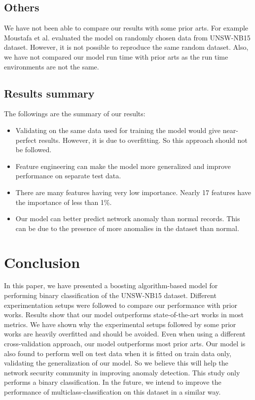 \documentclass[14pt, conference]{IEEEtran}
\begin{document}
\subsection{Others}
We have not been able to compare our results with some prior arts. For example Moustafa et al. \cite{moustafa2017hybrid} \cite{moustafa2018anomaly} \cite{moustafa2019holistic} evaluated the model on randomly chosen data from UNSW-NB15 dataset. However, it is not possible to reproduce the same random dataset. Also, we have not compared our model run time with prior arts as the run time environments are not the same.



\subsection{Results summary}

The followings are the summary of our results:
\begin{itemize}
    \item Validating on the same data used for training the model would give near-perfect results. However, it is due to overfitting. So this approach should not be followed.
    \item Feature engineering can make the model more generalized and improve performance on separate test data.
    \item There are many features having very low importance. Nearly 17 features have the importance of less than 1\%.
    \item Our model can better predict network anomaly than normal records. This can be due to the presence of more anomalies in the dataset than normal.
\end{itemize}

\section{Conclusion \label{conclusion}}
In this paper, we have presented a boosting algorithm-based model for performing binary classification of the UNSW-NB15 dataset.
Different experimentation setups were followed to compare our performance with prior works. Results show that our model outperforms state-of-the-art works in most metrics. We have shown why the experimental setups followed by some prior works are heavily overfitted and should be avoided. Even when using a different cross-validation approach, our model outperforms most prior arts. Our model is also found to perform well on test data when it is fitted on train data only, validating the generalization of our model. So we believe this will help the network security community in improving anomaly detection. This study only performs a binary classification. In the future, we intend to improve the performance of multiclass-classification on this dataset in a similar way.



\end{document}
